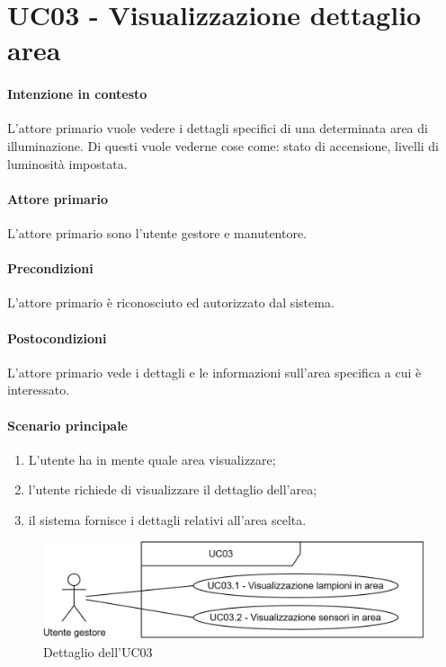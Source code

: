 \section{UC03 - Visualizzazione dettaglio area}\label{uc:03}
\paragraph{Intenzione in contesto} L'attore primario vuole vedere i dettagli specifici di una determinata area di illuminazione. Di questi vuole vederne cose come: stato di accensione, livelli di luminosità impostata.

\paragraph{Attore primario} L'attore primario sono l'utente gestore e manutentore.

\paragraph{Precondizioni} L'attore primario è riconosciuto ed autorizzato dal sistema.

\paragraph{Postocondizioni} L'attore primario vede i dettagli e le informazioni sull'area specifica a cui è interessato.

\paragraph{Scenario principale}

\begin{enumerate}
    \item L'utente ha in mente quale area visualizzare;
    \item l'utente richiede di visualizzare il dettaglio dell'area;
    \item il sistema fornisce i dettagli relativi all'area scelta.
\end{enumerate}

\begin{figure}[h]
    \includegraphics[width=\textwidth]{contenuti/img/casi_uso_grafici-uc03.png}
    \caption{Dettaglio dell'UC03}
    \label{fig:uc03}
\end{figure}

